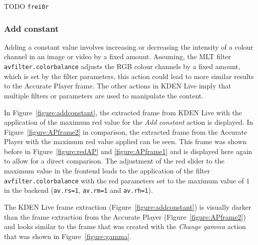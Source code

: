 \documentclass[../MasterThesis.tex]{subfiles}
\begin{document}
TODO \texttt{frei0r}




\subsubsection*{Add constant}

Adding a constant value involves increasing or decreasing the intensity of a colour channel in an image or video by a fixed amount. Assuming, the MLT filter \texttt{avfilter.colorbalance} adjusts the RGB colour channels by a fixed amount, which is set by the filter parameters, this action could lead to more similar results to the Accurate Player frame. The other actions in KDEN Live imply that multiple filters or parameters are used to manipulate the content. 

In Figure~\ref{figure:addconstant}, the extracted frame from KDEN Live with the application of the maximum red value for the \textit{Add constant} action is displayed. 
In Figure~\ref{figure:APframe2} in comparison, the extracted frame from the Accurate Player with the maximum red value applied can be seen. This frame was shown before in Figure~\ref{figure:redAP} and \ref{figure:APframe1} and is displayed here again to allow for a direct comparison. The adjustment of the red slider to the maximum value in the frontend leads to the application of the filter \texttt{avfilter.colorbalance} with the red parameters set to the maximum value of $1$ in the backend (\texttt{av.rs=1}, \texttt{av.rm=1} and \texttt{av.rh=1}).

The KDEN Live frame extraction (Figure~\ref{figure:addconstant}) is visually darker than the frame extraction from the Accurate Player (Figure~\ref{figure:APframe2}) and looks similar to the frame that was created with the \textit{Change gamma} action that was shown in Figure~\ref{figure:gamma}.
\end{document}
